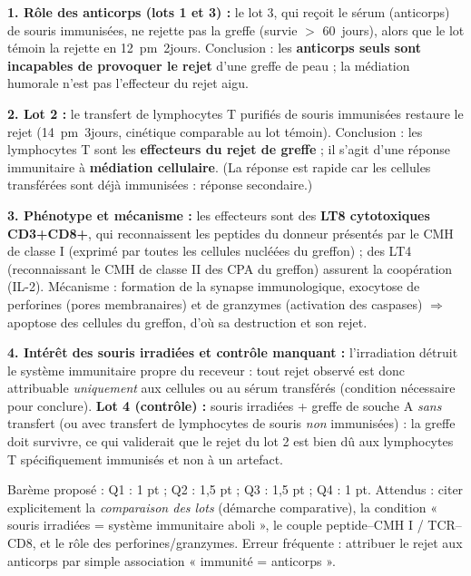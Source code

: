 \documentclass[11pt]{article}
\newcommand{\cle}[1]{{\popxbold\color{popdark}#1}}
\begin{document}
\begin{corrige}
\textbf{1. Rôle des anticorps (lots 1 et 3) :} le lot 3, qui reçoit le sérum (anticorps) de souris immunisées, ne rejette pas la greffe (survie $>$ \SI{60}{jours}), alors que le lot témoin la rejette en \SI{12}{\pm 2}{jours}. Conclusion : les \textbf{anticorps seuls sont incapables de provoquer le rejet} d'une greffe de peau ; la médiation humorale n'est pas l'effecteur du rejet aigu.

\textbf{2. Lot 2 :} le transfert de \cle{lymphocytes T} purifiés de souris immunisées restaure le rejet (\SI{14}{\pm 3}{jours}, cinétique comparable au lot témoin). Conclusion : les lymphocytes T sont les \textbf{effecteurs du rejet de greffe} ; il s'agit d'une réponse immunitaire à \textbf{médiation cellulaire}. (La réponse est rapide car les cellules transférées sont déjà immunisées : réponse secondaire.)

\textbf{3. Phénotype et mécanisme :} les effecteurs sont des \textbf{LT8 cytotoxiques CD3+CD8+}, qui reconnaissent les peptides du donneur présentés par le \cle{CMH de classe I} (exprimé par toutes les cellules nucléées du greffon) ; des LT4 (reconnaissant le CMH de classe II des CPA du greffon) assurent la coopération (IL-2). Mécanisme : formation de la synapse immunologique, exocytose de \cle{perforines} (pores membranaires) et de \cle{granzymes} (activation des caspases) $\Rightarrow$ apoptose des cellules du greffon, d'où sa destruction et son rejet.

\textbf{4. Intérêt des souris irradiées et contrôle manquant :} l'irradiation détruit le système immunitaire propre du receveur : tout rejet observé est donc attribuable \emph{uniquement} aux cellules ou au sérum transférés (condition nécessaire pour conclure). \textbf{Lot 4 (contrôle) :} souris irradiées + greffe de souche A \emph{sans} transfert (ou avec transfert de lymphocytes de souris \emph{non} immunisées) : la greffe doit survivre, ce qui validerait que le rejet du lot 2 est bien dû aux lymphocytes T spécifiquement immunisés et non à un artefact.
\end{corrige}

\begin{attention}
Barème proposé : Q1 : 1 pt ; Q2 : 1,5 pt ; Q3 : 1,5 pt ; Q4 : 1 pt. Attendus : citer explicitement la \emph{comparaison des lots} (démarche comparative), la condition « souris irradiées = système immunitaire aboli », le couple peptide--CMH I / TCR--CD8, et le rôle des perforines/granzymes. Erreur fréquente : attribuer le rejet aux anticorps par simple association « immunité = anticorps ».
\end{attention}
\end{document}
